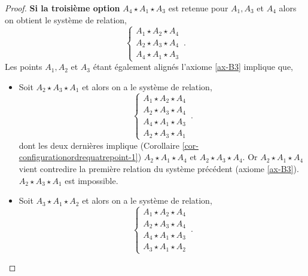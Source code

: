 \begin{cor}
\begin{proof}
        \textbf{Si la troisième option} $A_4 \star A_1 \star A_3$ est retenue pour $A_1,A_3$ et $A_4$ alors on obtient le système de relation,
        \begin{equation*}
        \left\{
            \begin{array}{c}
                 A_1 \star A_2 \star A_4 \\
                 A_2 \star A_3 \star A_4 \\
                 A_4 \star A_1 \star A_3 
            \end{array}
            \right. \,.
        \end{equation*}
        Les points $A_1,A_2$ et $A_3$ étant également alignés l'axiome \ref{ax-B3} implique que, 
        \begin{itemize}[$\bullet$]
            \item Soit $A_2 \star A_3 \star A_1$ et alors on a le système de relation,
            \begin{equation*}
            \left\{
            \begin{array}{c}
                 A_1 \star A_2 \star A_4 \\
                 A_2 \star A_3 \star A_4 \\
                 A_4 \star A_1 \star A_3 \\
                 A_2 \star A_3 \star A_1
            \end{array}
            \right. \,.
            \end{equation*}
            dont les deux dernières implique (Corollaire \ref{cor-configurationordrequatrepoint-1}) $A_2 \star A_1 \star A_4$ et $A_2 \star A_3 \star A_4$. Or $A_2 \star A_1 \star A_4$ vient contredire la première relation du système précédent (axiome \ref{ax-B3}). $A_2 \star A_3 \star A_1$ est impossible.
            \item Soit $A_3 \star A_1 \star A_2$ et alors on a le système de relation,
            \begin{equation*}
            \left\{
            \begin{array}{c}
                 A_1 \star A_2 \star A_4 \\
                 A_2 \star A_3 \star A_4 \\
                 A_4 \star A_1 \star A_3 \\
                 A_3 \star A_1 \star A_2
            \end{array}
            \right. \,.
            \end{equation*}

\end{itemize}
\end{proof}
\end{cor}
